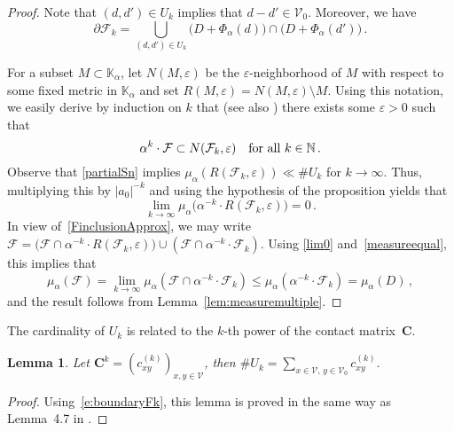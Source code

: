 \documentclass[12pt]{amsart}
\newtheorem{lemma}{Lemma}[section]
\theoremstyle{definition}
\theoremstyle{remark}
\numberwithin{equation}{section}
\begin{document}
\begin{proof}
Note that $(d,d') \in U_k$ implies that $d-d' \in \mathcal{V}_0$.
Moreover, we have
\begin{equation}\label{partialSn}
\partial \mathcal{F}_k = \bigcup_{(d,d') \in U_k} \big(D+\Phi_\alpha(d)\big) \cap \big(D+\Phi_\alpha(d')\big)\,.
\end{equation}

For a subset $M \subset \mathbb{K}_\alpha$, let $N(M,\varepsilon)$ be the $\varepsilon$-neighborhood of $M$ with respect to some fixed metric in $\mathbb{K}_\alpha$ and set $R(M,\varepsilon) = N(M,\varepsilon) \setminus M$.
Using this notation, we easily derive by induction on $k$ that (see also \cite[Lemma~4.4]{Groechenig-Haas:94}) there exists some $\varepsilon > 0$ such that
\begin{equation}\label{FinclusionApprox}
\alpha^k \cdot \mathcal{F} \subset N(\mathcal{F}_k, \varepsilon) \quad \hbox{for all}\ k \in \mathbb{N}\,.
\end{equation}
Observe that \eqref{partialSn} implies $\mu_\alpha(R(\mathcal{F}_k, \varepsilon)) \ll \#U_k$ for $k \to \infty$.
Thus, multiplying this by $|a_0|^{-k}$ and using the hypothesis of the proposition yields that
\begin{equation}\label{lim0}
\lim_{k \to \infty} \mu_\alpha\big(\alpha^{-k} \cdot R(\mathcal{F}_k, \varepsilon)\big) = 0\,.
\end{equation}
In view of~\eqref{FinclusionApprox}, we may write
$\mathcal{F} = \big(\mathcal{F} \cap \alpha^{-k} \cdot R(\mathcal{F}_k, \varepsilon)\big) \cup (\mathcal{F} \cap \alpha^{-k} \cdot \mathcal{F}_k)$.
Using \eqref{lim0} and~\eqref{measureequal},  this implies that
\[
\mu_{\alpha}(\mathcal{F}) = \lim_{k\to\infty} \mu_{\alpha}(\mathcal{F} \cap \alpha^{-k} \cdot \mathcal{F}_k) \le \mu_{\alpha}(\alpha^{-k} \cdot \mathcal{F}_k) = \mu_\alpha(D)\,,
\]
and the result follows from Lemma~\ref{lem:measuremultiple}.
\end{proof}

The cardinality of $U_k$ is related to the $k$-th power of the contact matrix~$\mathbf{C}$.

\begin{lemma}\label{sigmacontact}
Let $\mathbf{C}^k = (c_{x y}^{(k)})_{x,y\in\mathcal{V}}$, then $\#U_k = \sum_{x\in\mathcal{V},\,y\in\mathcal{V}_0} c_{x y}^{(k)}$.
\end{lemma}

\begin{proof}
Using~\eqref{e:boundaryFk}, this lemma is proved in the same way as Lemma~4.7 in \cite{Groechenig-Haas:94}.
\end{proof}
\end{document}
